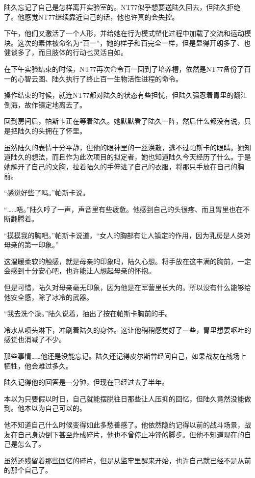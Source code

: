 陆久忘记了自己是怎样离开实验室的。NT77似乎想要送陆久回去，但陆久拒绝了。他感觉NT77继续靠近自己的话，他也许真的会失控。

下午，他们又激活了一个人形，并给她在行为模式塑化过程中加载了交流和运动模块。这次的素体被命名为“百一”，她的样子和百完全一样，但是显得开朗多了、也健谈多了，而且肢体的行动也灵活自如。

在下午实验结束的时候，NT77再次命令百一回到了培养槽，依然是NT77备份了百一的心智云图、陆久执行了终止百一生物活性进程的命令。

操作结束的时候，就连NT77都对陆久的状态有些担忧，但陆久强忍着胃里的翻江倒海，故作镇定地离去了。

回到房间后，帕斯卡正在等着陆久。她默默看了陆久一阵，然后什么都没有说，只是把陆久的头拥在了怀里。

虽然陆久的表情十分平静，但他的眼神里的一丝涣散，逃不过帕斯卡的眼睛。她知道陆久的想法，而且作为此次项目的拟定者，她也知道陆久今天经历了什么。于是她解开了自己的文胸，拉着陆久的手伸进了自己的衣服，将那只手放在自己的胸前。

“感觉好些了吗。”帕斯卡说。

“……唔。”陆久哼了一声，声音里有些疲惫。他感到自己的头很疼、而且胃里也在不断翻腾着。

“摸摸我的胸吧。”帕斯卡说道，“女人的胸部有让人镇定的作用，因为乳房是人类对母亲的第一印象。”

这温暖柔软的触感，就是母亲的印象吗，陆久心想。将手放在这丰满的胸前，一定会感到十分安心吧，也许能让人想起母亲的怀抱。

但是可惜，陆久对母亲毫无印象，因为他是在军营里长大的。所以没有什么能够给他安全感，除了冰冷的武器。

“我去洗个澡。”陆久说着，抽出了按在帕斯卡胸前的手。

冷水从喷头淋下，冲刷着陆久的身体。这让他稍稍感觉好了一些，胃里想要呕吐的感觉也消减了不少。

那些事情……他还是没能忘记。陆久还记得皮尔斯曾经问自己，如果战友在战场上牺牲，他会难过多久。

陆久记得他的回答是一分钟，但现在已经过去了半年。

本以为只要假以时日，自己就能摆脱往日那些让人压抑的回忆，但陆久竟然没能做到。他本以为自己可以的。

他不知道自己什么时候变得如此多愁善感了。他依然隐约记得以前的战斗场景，战友在自己身边倒下甚至炸成碎片，他也不曾停止冲锋的脚步。但他不知道现在的自己是怎么了。

虽然还残留着那些回忆的碎片，但是从监牢里醒来开始，也许自己就已经不是从前的那个自己了。

